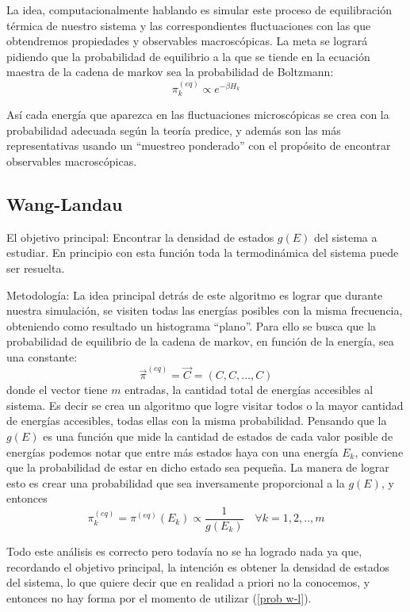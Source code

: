 \documentclass[12pt]{book}
\begin{document}
La idea, computacionalmente hablando es simular este proceso de equilibración térmica de nuestro sistema y las correspondientes fluctuaciones con las que obtendremos propiedades y observables macroscópicas. La meta se logrará pidiendo que la probabilidad de equilibrio a la que se tiende en la ecuación maestra de la cadena de markov sea la probabilidad de Boltzmann:
\begin{equation}
\pi_{k}^{(eq)}\propto e^{-\beta H_{k}}
\end{equation}

Así cada energía que aparezca en las fluctuaciones microscópicas se crea con la probabilidad adecuada según la teoría predice, y además son las más representativas usando un ``muestreo ponderado'' con el propósito de encontrar observables macroscópicas.


\subsection{Wang-Landau}
El objetivo principal: Encontrar la densidad de estados $g(E)$ del sistema a estudiar. En principio con esta función toda la termodinámica del sistema puede ser resuelta.

Metodología: La idea principal detrás de este algoritmo es lograr que durante nuestra simulación, se visiten todas las energías posibles con la misma frecuencia, obteniendo como resultado un histograma ``plano''. Para ello se busca que la probabilidad de equilibrio de la cadena de markov, en función de la energía, sea una constante:
\begin{equation}
\vec{\pi}^{(eq)}=\vec{C}=(C,C,...,C)
\end{equation}
donde el vector tiene $m$ entradas, la cantidad total de energías accesibles al sistema. Es decir se crea un algoritmo que logre visitar todos o la mayor cantidad de energías accesibles, todas ellas con la misma probabilidad. Pensando que la $g(E)$ es una función que mide la cantidad de estados de cada valor posible de energías podemos notar que entre más estados haya con una energía $E_{k}$, conviene que la probabilidad de estar en dicho estado sea pequeña. La manera de lograr esto es crear una probabilidad que sea inversamente proporcional a la $g(E)$, y entonces 
\begin{equation}
\pi_{k}^{(eq)}=\pi^{(eq)}(E_{k})\propto \frac{1}{g(E_{k})} \quad \forall k=1,2,..,m \label{prob w-l}
\end{equation}

Todo este análisis es correcto pero todavía no se ha logrado nada ya que, recordando el objetivo principal, la intención es obtener la densidad de estados del sistema, lo que quiere decir que en realidad a priori no la conocemos, y entonces no hay forma por el momento de utilizar (\ref{prob w-l}).
\end{document}
